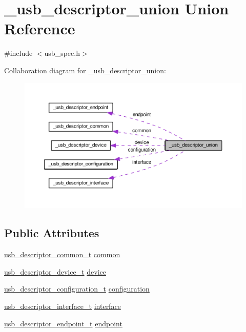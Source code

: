\hypertarget{union__usb__descriptor__union}{\section{\-\_\-usb\-\_\-descriptor\-\_\-union Union Reference}
\label{union__usb__descriptor__union}
}


{\ttfamily \#include $<$usb\-\_\-spec.\-h$>$}



Collaboration diagram for \-\_\-usb\-\_\-descriptor\-\_\-union\-:
\nopagebreak
\begin{figure}[H]
\begin{center}
\leavevmode
\includegraphics[width=350pt]{union__usb__descriptor__union__coll__graph}
\end{center}
\end{figure}
\subsection*{Public Attributes}
\begin{DoxyCompactItemize}
\item 
\hyperlink{usb__spec_8h_a6fdc206f234368d3db7a7aa45e5df2a0}{usb\-\_\-descriptor\-\_\-common\-\_\-t} \hyperlink{union__usb__descriptor__union_adbb5a230ae9c9c299e1398c0f7361a4a}{common}
\item 
\hyperlink{usb__spec_8h_a5af0d62b781191703bbb50ed472861d8}{usb\-\_\-descriptor\-\_\-device\-\_\-t} \hyperlink{union__usb__descriptor__union_ab0f9d91c22e5151ad404faa1159efd24}{device}
\item 
\hyperlink{usb__spec_8h_a5e106a3399250cd7c20963a4eb12a8ee}{usb\-\_\-descriptor\-\_\-configuration\-\_\-t} \hyperlink{union__usb__descriptor__union_af9a5be6c3597522784f782423a08e3a2}{configuration}
\item 
\hyperlink{usb__spec_8h_abc473cfd98833509f0eec72b33257836}{usb\-\_\-descriptor\-\_\-interface\-\_\-t} \hyperlink{union__usb__descriptor__union_a47f00994f688807bc39aec487aac63db}{interface}
\item 
\hyperlink{usb__spec_8h_a08bf205be66c1b4a67a3760022439c22}{usb\-\_\-descriptor\-\_\-endpoint\-\_\-t} \hyperlink{union__usb__descriptor__union_a0898c3f96511e958256c2e9d501df555}{endpoint}
\end{DoxyCompactItemize}


